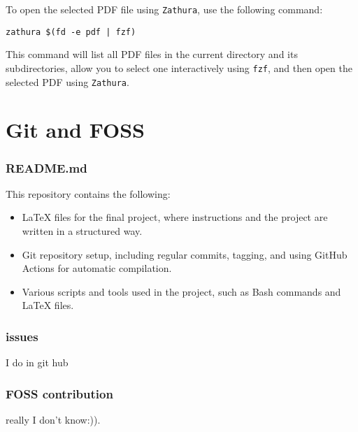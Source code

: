 \documentclass{article}
\begin{document}
To open the selected PDF file using \texttt{Zathura}, use the following command:

\begin{verbatim}
zathura $(fd -e pdf | fzf)
\end{verbatim}
This command will list all PDF files in the current directory and its subdirectories, allow you to select one interactively using \texttt{fzf}, and then open the selected PDF using \texttt{Zathura}.

\section{Git and FOSS}
\subsubsection{README.md}
This repository contains the following:

\begin{itemize}
    \item LaTeX files for the final project, where instructions and the project are written in a structured way.
    \item Git repository setup, including regular commits, tagging, and using GitHub Actions for automatic compilation.
    \item Various scripts and tools used in the project, such as Bash commands and LaTeX files.
\end{itemize}

\subsubsection{issues}
I do in git hub\\

\subsubsection{FOSS contribution}
really I don't know:)).
\end{document}

